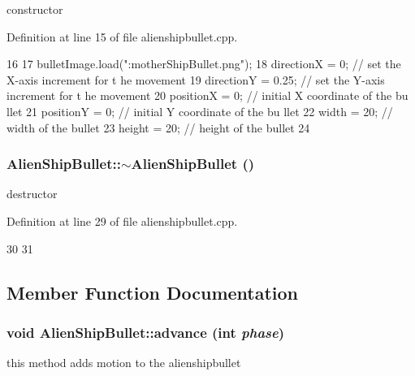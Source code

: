 constructor 

Definition at line 15 of file alienshipbullet.cpp.


\begin{DoxyCode}
16 {
17     bulletImage.load(":motherShipBullet.png");
18     directionX = 0;                             // set the X-axis increment for t
      he movement
19     directionY = 0.25;                          // set the Y-axis increment for t
      he movement
20     positionX = 0;                              // initial X coordinate of the bu
      llet
21     positionY = 0;                              // initial Y coordinate of the bu
      llet
22     width = 20;                                 // width of the bullet
23     height = 20;                                // height of the bullet
24 }
\end{DoxyCode}
\hypertarget{class_alien_ship_bullet_a6af8a67dca6b5da79602a4f1c5d06c7f}{
\subsubsection[{$\sim$AlienShipBullet}]{\setlength{\rightskip}{0pt plus 5cm}AlienShipBullet::$\sim$AlienShipBullet ()}}
\label{class_alien_ship_bullet_a6af8a67dca6b5da79602a4f1c5d06c7f}
destructor 

Definition at line 29 of file alienshipbullet.cpp.


\begin{DoxyCode}
30 {
31 }
\end{DoxyCode}


\subsection{Member Function Documentation}
\hypertarget{class_alien_ship_bullet_a29af8ac3011d72e8b845019e76ab203d}{
\subsubsection[{advance}]{\setlength{\rightskip}{0pt plus 5cm}void AlienShipBullet::advance (int {\em phase})}}
\label{class_alien_ship_bullet_a29af8ac3011d72e8b845019e76ab203d}
this method adds motion to the alienshipbullet 


